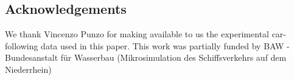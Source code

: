 \documentclass[review]{elsarticle}
\providecommand{\3}{{\ss}}
\begin{document}
	
	\subsection*{Acknowledgements}
	We thank Vincenzo Punzo for making available to us the experimental
	car-following data used in this paper. This work was partially funded by BAW - Bundesanstalt für Wasserbau (Mikrosimulation des Schiffsverkehrs auf dem Niederrhein)
	
	
	
	
	
	
	
\end{document}
